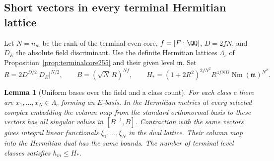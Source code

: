 \documentclass[a4paper,11pt]{article}
\newtheorem{lemma}[proposition]{Lemma}
\theoremstyle{definition}
\theoremstyle{remark}
\numberwithin{equation}{section}
\begin{document}
\subsection{Short vectors in every terminal Hermitian lattice}\label{nav:IX-38}
Let \(N=n_m\) be the rank of the terminal even core, \(f=[F:\QQ]\),
\(D=2fN\), and \(D_E\) the absolute field discriminant.
Use the definite Hermitian lattices \(\Lambda_c\) of
Proposition~\ref{prop:terminalcore255} and their given level
\(\mathfrak m\). Set
\[
 R=2D^{D/2}|D_E|^{N/2},\qquad B=(\sqrt N\,R)^{Nf},\qquad
 H_*=(1+2R^2)^{2fN^2} R^{4fND}
                        \operatorname{Nm}(\mathfrak m)^{N^2}.
\]

\begin{lemma}[Uniform bases over the field and a class count]\leavevmode
\label{lem:terminalclass259}
For each class \(c\) there are \(x_1,\ldots,x_N\in\Lambda_c\)
forming an \(E\)-basis. In the Hermitian metrics at every selected
complex embedding the column map from the standard orthonormal
basis to these vectors has all singular values in
\([B^{-1},B]\). Contraction with the same vectors gives integral
linear functionals \(\xi_1,\ldots,\xi_N\) in the dual lattice.
Their column map into the Hermitian dual has the same bounds.
The number of terminal level classes satisfies \(h_m\le H_*\).
\end{lemma}
\end{document}
